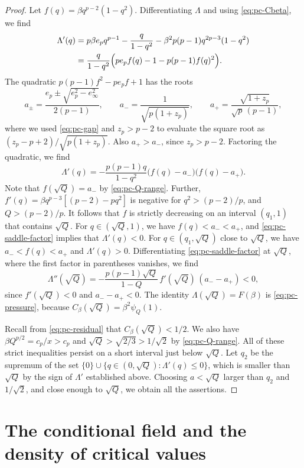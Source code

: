 \begin{proof}
Let $f(q)=\beta q^{p-2}(1-q^2)$. Differentiating $\Lambda$ and using \eqref{eq:pc-Cbeta}, we find
\[
\begin{aligned}
\Lambda'(q)&=p\beta e_pq^{p-1}-\frac q{1-q^2}-\beta^2p(p-1)q^{2p-3}(1-q^2)\\
&=\frac q{1-q^2}\Bigl(pe_pf(q)-1-p(p-1)f(q)^2\Bigr).
\end{aligned}
\]
The quadratic $p(p-1)f^2-pe_pf+1$ has the roots
\[
a_\pm=\frac{e_p\pm\sqrt{e_p^2-e_\infty^2}}{2(p-1)},\qquad a_-=\frac1{\sqrt{p(1+z_p)}},\qquad a_+=\frac{\sqrt{1+z_p}}{\sqrt p\,(p-1)},
\]
where we used \eqref{eq:pc-gap} and $z_p>p-2$ to evaluate the square root as $(z_p-p+2)/\sqrt{p(1+z_p)}$. Also $a_+>a_-$, since $z_p>p-2$. Factoring the quadratic, we find
\begin{equation}\label{eq:pc-saddle-factor}
\Lambda'(q)=-\frac{p(p-1)q}{1-q^2}\bigl(f(q)-a_-\bigr)\bigl(f(q)-a_+\bigr).
\end{equation}
Note that $f(\sqrt Q)=a_-$ by \eqref{eq:pc-Q-range}. Further, $f'(q)=\beta q^{p-3}[(p-2)-pq^2]$ is negative for $q^2>(p-2)/p$, and $Q>(p-2)/p$. It follows that $f$ is strictly decreasing on an interval $(q_1,1)$ that contains $\sqrt Q$. For $q\in(\sqrt Q,1)$, we have $f(q)<a_-<a_+$, and \eqref{eq:pc-saddle-factor} implies that $\Lambda'(q)<0$. For $q\in(q_1,\sqrt Q)$ close to $\sqrt Q$, we have $a_-<f(q)<a_+$ and $\Lambda'(q)>0$. Differentiating \eqref{eq:pc-saddle-factor} at $\sqrt Q$, where the first factor in parentheses vanishes, we find
\[
\Lambda''(\sqrt Q)=-\frac{p(p-1)\sqrt Q}{1-Q}\,f'(\sqrt Q)\,(a_--a_+)<0,
\]
since $f'(\sqrt Q)<0$ and $a_--a_+<0$. The identity $\Lambda(\sqrt Q)=F(\beta)$ is \eqref{eq:pc-pressure}, because $C_\beta(\sqrt Q)=\beta^2\psi_Q(1)$.

Recall from \eqref{eq:pc-residual} that $C_\beta(\sqrt Q)<1/2$. We also have $\beta Q^{p/2}=c_p/x>c_p$ and $\sqrt Q>\sqrt{2/3}>1/\sqrt2$ by \eqref{eq:pc-Q-range}. All of these strict inequalities persist on a short interval just below $\sqrt Q$. Let $q_2$ be the supremum of the set $\{0\}\cup\{q\in(0,\sqrt Q):\Lambda'(q)\le0\}$, which is smaller than $\sqrt Q$ by the sign of $\Lambda'$ established above. Choosing $a<\sqrt Q$ larger than $q_2$ and $1/\sqrt2$, and close enough to $\sqrt Q$, we obtain all the assertions.
\end{proof}

\section{The conditional field and the density of critical values}\label{sec:pc-density}

